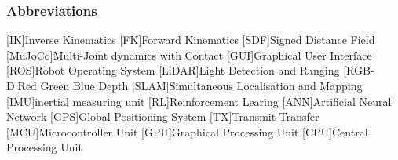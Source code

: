 \begin{Nomencl}[2.75cm]
\end{Nomencl}

\subsubsection*{Abbreviations}
    \hfill\begin{minipage}{\dimexpr\textwidth-\NomLblSep}
        \begin{acronym}[MMMMMMii]
            [IK]{Inverse Kinematics}
            [FK]{Forward Kinematics}
            [SDF]{Signed Distance Field}
            [MuJoCo]{Multi-Joint dynamics with Contact}
            [GUI]{Graphical User Interface}
            [ROS]{Robot Operating System}
            [LiDAR]{Light Detection and Ranging}
            [RGB-D]{Red Green Blue Depth}
            [SLAM]{Simultaneous Localisation and Mapping}
            [IMU]{inertial measuring unit}
            [RL]{Reinforcement Learing}
            [ANN]{Artificial Neural Network}
            [GPS]{Global Positioning System}
            [TX]{Transmit Transfer}
            [MCU]{Microcontroller Unit}
            [GPU]{Graphical Processing Unit}
            [CPU]{Central Processing Unit}
        \end{acronym}       
    \end{minipage}
